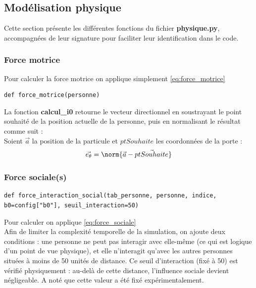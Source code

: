 \documentclass[a4paper,12pt]{article}
\begin{document}
\subsection{Modélisation physique}
Cette section présente les différentes fonctions du fichier \textbf{physique.py}, accompagnées de leur signature pour faciliter leur identification dans le code.
\subsubsection{Force motrice}

Pour calculer la force motrice on applique simplement \eqref{eq:force_motrice}

\begin{verbatim}
def force_motrice(personne)
\end{verbatim}

La fonction \textbf{calcul\_i0} retourne le vecteur directionnel en soustrayant le point souhaité de la position actuelle de la personne, puis en normalisant le résultat comme suit :
\\
\indent Soient $\vec{a}$ la position de la particule et $ptSouhaite$ les coordonnées de la porte :
\begin{equation}
	\vec{e_\theta} = \norm{\vec{a} - \vec{ptSouhaite}}
\end{equation}


\subsubsection{Force sociale(s)}


\begin{verbatim}
def force_interaction_social(tab_personne, personne, indice, b0=config["b0"], seuil_interaction=50)
\end{verbatim}

Pour calculer on applique \eqref{eq:force_sociale}
\\

Afin de limiter la complexité temporelle de la simulation, on ajoute deux conditions : une personne ne peut pas interagir avec elle-même (ce qui est logique d’un point de vue physique), et elle n’interagit qu’avec les autres personnes situées à moins de 50 unités de distance.  Ce seuil d’interaction (fixé à 50) est vérifié physiquement : au-delà de cette distance, l’influence sociale devient négligeable. A noté que cette valeur a été fixé expérimentalement.
\end{document}
